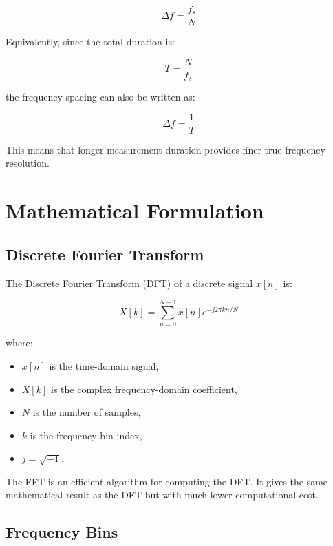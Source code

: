 \documentclass[11pt,a4paper]{article}
\begin{document}
\begin{equation}
    \Delta f = \frac{f_s}{N}
\end{equation}

Equivalently, since the total duration is:

\begin{equation}
    T = \frac{N}{f_s}
\end{equation}

the frequency spacing can also be written as:

\begin{equation}
    \Delta f = \frac{1}{T}
\end{equation}

This means that longer measurement duration provides finer true frequency resolution.

\section{Mathematical Formulation}

\subsection{Discrete Fourier Transform}

The Discrete Fourier Transform (DFT) of a discrete signal \(x[n]\) is:

\begin{equation}
    X[k] =
    \sum_{n=0}^{N-1}
    x[n] e^{-j 2\pi kn/N}
\end{equation}

where:

\begin{itemize}
    \item \(x[n]\) is the time-domain signal,
    \item \(X[k]\) is the complex frequency-domain coefficient,
    \item \(N\) is the number of samples,
    \item \(k\) is the frequency bin index,
    \item \(j = \sqrt{-1}\).
\end{itemize}

The FFT is an efficient algorithm for computing the DFT. It gives the same mathematical result as the DFT but with much lower computational cost.

\subsection{Frequency Bins}
\end{document}
